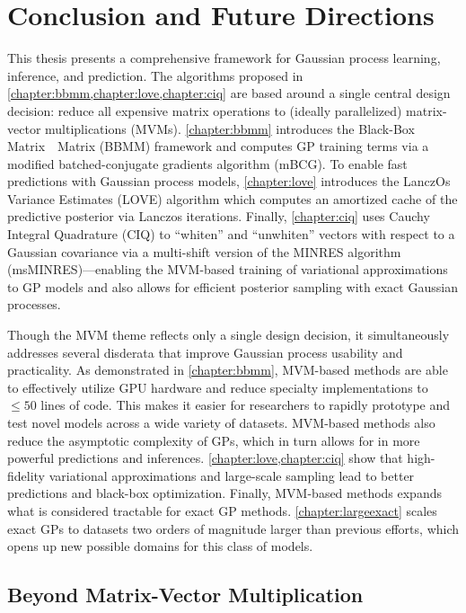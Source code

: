 \chapter{Conclusion and Future Directions}
\label{chapter:discussion}


This thesis presents a comprehensive framework for Gaussian process learning, inference, and prediction.
The algorithms proposed in \cref{chapter:bbmm,chapter:love,chapter:ciq} are based around a single central design decision: reduce all expensive matrix operations to (ideally parallelized) matrix-vector multiplications (MVMs).
\cref{chapter:bbmm} introduces the Black-Box Matrix~\texttimes~Matrix (BBMM) framework and computes GP training terms via a modified batched-conjugate gradients algorithm (mBCG).
To enable fast predictions with Gaussian process models, \cref{chapter:love} introduces the LanczOs Variance Estimates (LOVE) algorithm which computes an amortized cache of the predictive posterior via Lanczos iterations.
Finally, \cref{chapter:ciq} uses Cauchy Integral Quadrature (CIQ) to ``whiten'' and ``unwhiten'' vectors with respect to a Gaussian covariance via a multi-shift version of the MINRES algorithm (msMINRES)---enabling
the MVM-based training of variational approximations to GP models and also allows for efficient posterior sampling with exact Gaussian processes.

Though the MVM theme reflects only a single design decision, it simultaneously addresses several disderata that improve Gaussian process usability and practicality.
As demonstrated in \cref{chapter:bbmm}, MVM-based methods are able to effectively utilize GPU hardware and reduce specialty implementations to $\leq 50$ lines of code.
This makes it easier for researchers to rapidly prototype and test novel models across a wide variety of datasets.
MVM-based methods also reduce the asymptotic complexity of GPs, which in turn allows for in more powerful predictions and inferences.
\cref{chapter:love,chapter:ciq} show that high-fidelity variational approximations and large-scale sampling lead to better predictions and black-box optimization.
Finally, MVM-based methods expands what is considered tractable for exact GP methods.
\cref{chapter:largeexact} scales exact GPs to datasets two orders of magnitude larger than previous efforts, which opens up new possible domains for this class of models.



\section{Beyond Matrix-Vector Multiplication}


